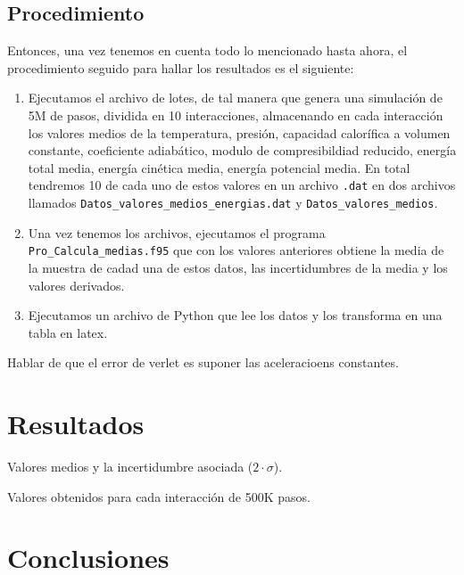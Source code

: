 \documentclass[11pt]{article} %
\begin{document}
\subsection{Procedimiento}

Entonces, una vez tenemos en cuenta todo lo mencionado hasta ahora, el procedimiento seguido para hallar los resultados es el siguiente:

\begin{enumerate}
	\item Ejecutamos el archivo de lotes, de tal manera que genera una simulación de 5M de pasos, dividida en 10 interacciones, almacenando en cada interacción los valores medios de la temperatura, presión, capacidad calorífica a volumen constante, coeficiente adiabático, modulo de compresibildiad reducido, energía total media, energía cinética media, energía potencial media. En total tendremos 10 de cada uno de estos valores en un archivo \texttt{.dat} en dos archivos llamados \texttt{Datos\_valores\_medios\_energias.dat} y \texttt{Datos\_valores\_medios}.
	
	\item Una vez tenemos los archivos, ejecutamos el programa \texttt{Pro\_Calcula\_medias.f95} que con los valores anteriores obtiene la media de la muestra de cadad una de estos datos, las incertidumbres de la media y los valores derivados. 
	
	\item Ejecutamos un archivo de Python que lee los datos y los transforma en una tabla en latex. 
\end{enumerate}


Hablar de que el error  de verlet es suponer las aceleracioens constantes.

\section{Resultados}

\begin{table}[h!] \centering

\caption{Valores medios y la incertidumbre asociada ($2\cdot \sigma$).}
\label{Tab:01}
\end{table}

\begin{table}[h!] \centering

\caption{Valores obtenidos para cada interacción de 500K pasos.}
\label{Tab:02}
\end{table}
\section{Conclusiones}




	
\end{document}
